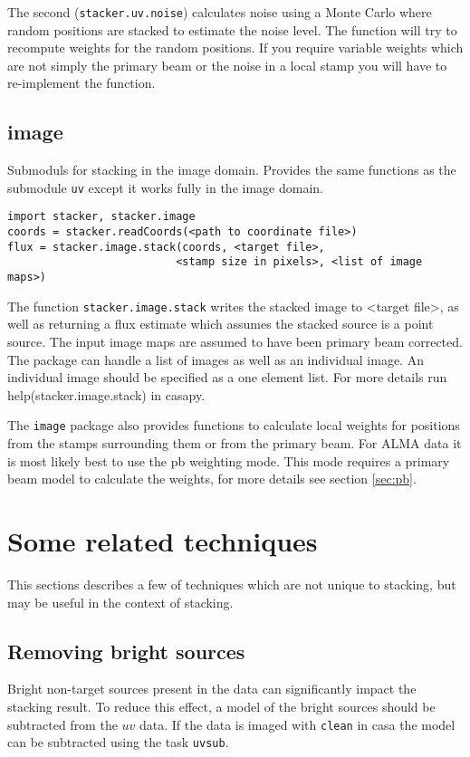 \documentclass{article}
\begin{document}
The second ({\tt stacker.uv.noise}) calculates noise using a Monte Carlo
where random positions are stacked to estimate the noise level. 
The function will try to recompute weights for the random positions.
If you require variable weights which are not simply the primary beam
or the noise in a local stamp you will have to re-implement the function.


\subsection{image}
Submoduls for stacking in the image domain.
Provides the same functions as the submodule {\tt uv} except it works fully in the image domain.
\begin{verbatim}
import stacker, stacker.image
coords = stacker.readCoords(<path to coordinate file>)
flux = stacker.image.stack(coords, <target file>, 
                          <stamp size in pixels>, <list of image maps>)
\end{verbatim}
The function {\tt stacker.image.stack} writes the stacked image to <target file>,
as well as returning a flux estimate which assumes the stacked source is a point source.
The input image maps are assumed to have been primary beam corrected.
The package can handle a list of images as well as an individual image.
An individual image should be specified as a one element list.
For more details run help(stacker.image.stack) in casapy.

The {\tt image} package also provides functions to calculate local weights for
positions from the stamps surrounding them or from the primary beam.
For ALMA data it is most likely best to use the pb weighting mode.
This mode requires a primary beam model to calculate the weights, 
for more details see section \ref{sec:pb}.

\section{Some related techniques}
This sections describes a few of techniques
which are not unique to stacking, 
but may be useful in the context of stacking.

\subsection{Removing bright sources}
Bright non-target sources present in the data can significantly impact the stacking result.
To reduce this effect, a model of the bright sources should be subtracted from the $uv$ data.
If the data is imaged with {\tt clean} in casa the model can be subtracted using the task {\tt uvsub}.
\end{document}
